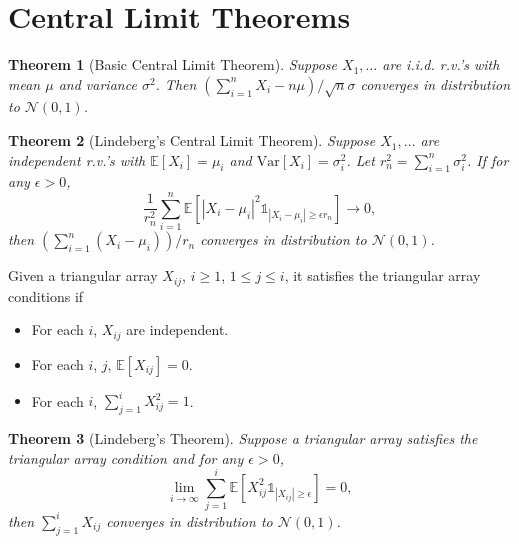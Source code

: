 \documentclass[openany]{book}
\newtheorem{theorem}{Theorem}[chapter]
\theoremstyle{definition}
\theoremstyle{remark}
\begin{document}
\section{Central Limit Theorems}
\begin{theorem}[Basic Central Limit Theorem]
    Suppose $X_1,\ldots$ are i.i.d. r.v.'s with mean $\mu$ and variance $\sigma^2$. Then $\left(\sum_{i=1}^{n}X_i-n\mu\right)/\sqrt{n}\sigma$ converges in distribution to $\mathcal{N}(0,1)$.
\end{theorem}
\begin{theorem}[Lindeberg's Central Limit Theorem]
    Suppose $X_1,\ldots$ are independent r.v.'s with $\mathbb{E}[X_i]=\mu_i$ and $\mathrm{Var}[X_i]=\sigma_i^2$. Let $r_n^2=\sum_{i=1}^{n}\sigma_i^2$. If for any $\epsilon>0$,
    \begin{equation*}
        \frac{1}{r_n^2}\sum_{i=1}^{n}\mathbb{E}\left[|X_i-\mu_i|^2\mathds{1}_{|X_i-\mu_i|\ge\epsilon r_n}\right]\to0,
    \end{equation*}
    then $\left(\sum_{i=1}^{n}(X_i-\mu_i)\right)/r_n$ converges in distribution to $\mathcal{N}(0,1)$.
\end{theorem}
Given a triangular array $X_{ij}$, $i\ge1$, $1\le j\le i$, it satisfies the triangular array conditions if
\begin{itemize}
    \item For each $i$, $X_{ij}$ are independent.
    \item For each $i$, $j$, $\mathbb{E}[X_{ij}]=0$.
    \item For each $i$, $\sum_{j=1}^{i}X_{ij}^2=1$.
\end{itemize}
\begin{theorem}[Lindeberg's Theorem]
    Suppose a triangular array satisfies the triangular array condition and for any $\epsilon>0$,
    \begin{equation*}
        \lim_{i\to\infty}\sum_{j=1}^{i}\mathbb{E}\left[X_{ij}^2\mathds{1}_{|X_{ij}|\ge\epsilon}\right]=0,
    \end{equation*}
    then $\sum_{j=1}^{i}X_{ij}$ converges in distribution to $\mathcal{N}(0,1)$.
\end{theorem}
\end{document}
